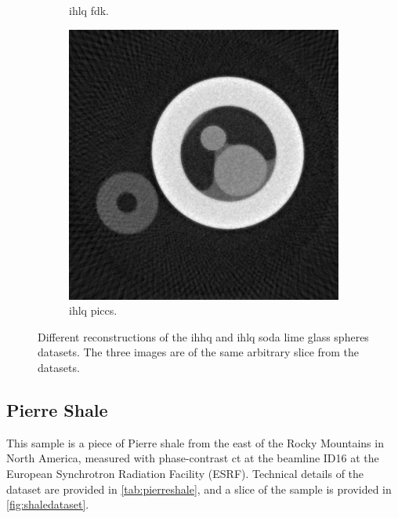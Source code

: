 \begin{figure}
\begin{subfigure}[t]{.31\textwidth}
      \caption{\gls{ihlq} \gls{fdk}.}
    \end{subfigure}
    \hfill  
    \begin{subfigure}[t]{.31\textwidth}
      \centering
      \includegraphics[width=\linewidth]{figures/kimrobertPICCS.png}
      \caption{\gls{ihlq} \gls{piccs}. }
    \end{subfigure}
    \caption[IHHQ and IHLQ soda lime glass spheres dataset]{Different reconstructions of the \gls{ihhq} and \gls{ihlq} soda lime glass spheres datasets. The three images are of the same arbitrary slice from the datasets. }
    \label{fig:kimrobertdatasets}
\end{figure}

\subsection{Pierre Shale}
\label{sec:method:datasets:shale}
This sample is a piece of Pierre shale from the east of the Rocky Mountains in North America, measured with phase-contrast \gls{ct} at the beamline ID16 at the European Synchrotron Radiation Facility (ESRF). Technical details of the dataset are provided in \cref{tab:pierreshale}, and a slice of the sample is provided in \cref{fig:shaledataset}. 

